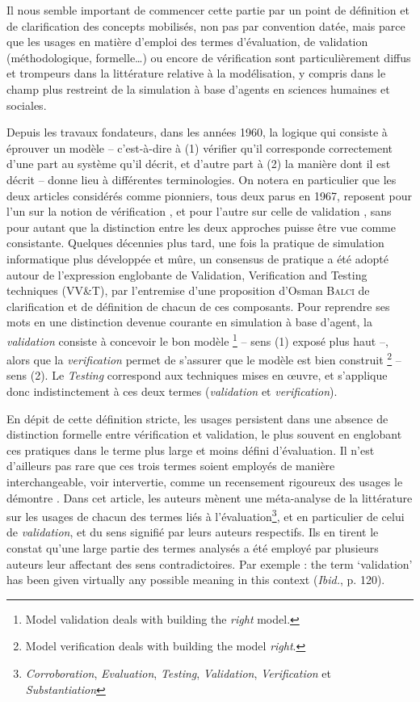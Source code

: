 Il nous semble important de commencer cette partie par un point de définition et de clarification des concepts mobilisés, non pas par convention datée, mais parce que les usages en matière d'emploi des termes d'évaluation, de validation (méthodologique, formelle\ldots) ou encore de vérification sont particulièrement diffus et trompeurs dans la littérature relative à la modélisation, y compris dans le champ plus restreint de la simulation à base d'agents en sciences humaines et sociales.

Depuis les travaux fondateurs, dans les années 1960, la logique qui consiste à éprouver un modèle -- c'est-à-dire à (1) vérifier qu'il corresponde correctement d'une part au système qu'il décrit, et d'autre part à (2) la manière dont il est décrit -- donne lieu à différentes terminologies.
On notera en particulier que les deux articles considérés comme pionniers, tous deux parus en 1967, reposent pour l'un sur la notion de vérification \autocite{naylor_verification_1967}, et pour l'autre sur celle de validation \autocite{hermann_validation_1967}, sans pour autant que la distinction entre les deux approches puisse être vue comme consistante.
Quelques décennies plus tard, une fois la pratique de simulation informatique plus développée et mûre, un consensus de pratique a été adopté autour de l'expression englobante de \og Validation, Verification and Testing techniques (VV\&T)\fg{}, par l'entremise d'une proposition d'Osman \textsc{Balci} \autocite{balci_validation_1994} de clarification et de définition de chacun de ces composants.
Pour reprendre ses mots en une distinction devenue courante en simulation à base d'agent, la \textit{validation} consiste à concevoir le bon modèle 
\footnote{
	\og Model validation deals with building the \textit{right} model.\fg{}
} -- sens (1) exposé plus haut --,
alors que la \textit{verification} permet de s'assurer que le modèle est bien construit
\footnote{
	\og Model verification deals with building the model \textit{right}.\fg{}
} -- sens (2).
Le \og \textit{Testing}\fg{} correspond aux techniques mises en œuvre, et s'applique donc indistinctement à ces deux termes (\textit{validation} et \textit{verification}).

En dépit de cette définition stricte, les usages persistent dans une absence de distinction formelle entre vérification et validation, le plus souvent en englobant ces pratiques dans le terme plus large et moins défini d'\og évaluation\fg{}.
Il n'est d'ailleurs pas rare que ces trois termes soient employés de manière interchangeable, voir intervertie, comme un recensement rigoureux des usages le démontre \autocite{augusiak_merging_2014}.
Dans cet article, les auteurs mènent une méta-analyse de la littérature sur les usages de chacun des termes liés à l'évaluation\footnote{\textit{Corroboration}, \textit{Evaluation}, \textit{Testing}, \textit{Validation}, \textit{Verification} et \textit{Substantiation}}, et en particulier de celui de \textit{validation}, et du sens signifié par leurs auteurs respectifs.
Ils en tirent le constat qu'une large partie des termes analysés a été employé par plusieurs auteurs leur affectant des sens contradictoires.
Par exemple : \og the term ‘validation’ has been given virtually any possible meaning in this context\fg{} (\textit{Ibid.}, p. 120).

